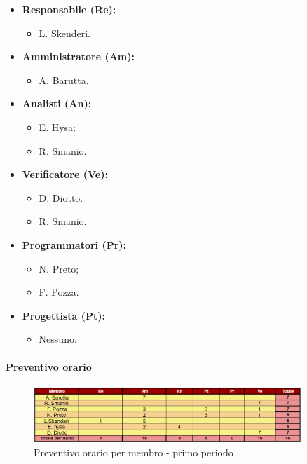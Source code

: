 \begin{itemize}
    \item \textbf{Responsabile (Re):}
          \begin{itemize}
              \item L. Skenderi.
          \end{itemize}
    \item \textbf{Amministratore (Am):}
          \begin{itemize}
              \item A. Barutta.
          \end{itemize}
    \item \textbf{Analisti (An):}
          \begin{itemize}
              \item E. Hysa;
              \item R. Smanio.
          \end{itemize}
    \item \textbf{Verificatore (Ve):}
          \begin{itemize}
              \item D. Diotto.
              \item R. Smanio.
          \end{itemize}
    \item \textbf{Programmatori (Pr):}
          \begin{itemize}
              \item N. Preto;
              \item F. Pozza.
          \end{itemize}
    \item \textbf{Progettista (Pt):}
          \begin{itemize}
              \item Nessuno.
          \end{itemize}
\end{itemize}

\paragraph{Preventivo orario} \hspace{1pt}

\begin{figure}[ht]
    \centering
    \includegraphics[width=0.9\textwidth]{../Images/preventivoOrario2Periodo.png}
    \caption{Preventivo orario per membro - primo periodo}
    \label{fig:Pv1}
\end{figure}

